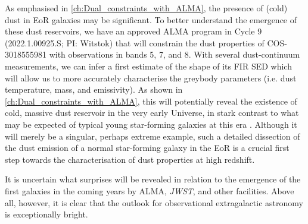 As emphasised in \cref{ch:Dual_constraints_with_ALMA}, the presence of (cold) dust in EoR galaxies may be significant. To better understand the emergence of these dust reservoirs, we have an approved ALMA program in Cycle 9 (2022.1.00925.S; PI: Witstok) that will constrain the dust properties of COS-3018555981 with observations in bands 5, 7, and 8. With several dust-continuum measurements, we can infer a first estimate of the shape of its FIR SED which will allow us to more accurately characterise the greybody parameters (i.e. dust temperature, mass, and emissivity). As shown in \cref{ch:Dual_constraints_with_ALMA}, this will potentially reveal the existence of cold, massive dust reservoir in the very early Universe, in stark contrast to what may be expected of typical young star-forming galaxies at this era \citep{2022MNRAS.513.3122S, 2022MNRAS.tmpL..72V}. Although it will merely be a singular, perhaps extreme example, such a detailed dissection of the dust emission of a normal star-forming galaxy in the EoR is a crucial first step towards the characterisation of dust properties at high redshift.

It is uncertain what surprises will be revealed in relation to the emergence of the first galaxies in the coming years by ALMA, \textit{JWST}, and other facilities. Above all, however, it is clear that the outlook for observational extragalactic astronomy is exceptionally bright.